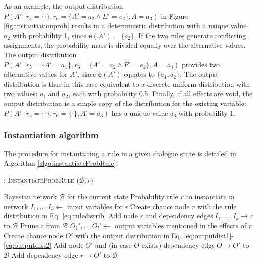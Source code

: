 As an example, the output distribution $P(A' \, | \, r_5\!=\!\{\cdot\},r_6\!=\!\{A'\!=\!a_2 \land E'\!=\!e_2\}, A\!=\!a_3)$ in Figure \ref{fig:instantiationprob} results in a deterministic distribution with a unique value $a_2$ with probability 1, since $\mathbf{e}(A') = \{a_2\}$. If the two rules generate conflicting assignments, the probability mass is divided equally over the alternative values.   The output distribution $P(A' \, | \, r_5\!=\!\{A'\!=\!a_1\},r_6\!=\!\{A'\!=\!a_2 \land E'\!=\!e_2\}, A\!=\!a_3)$ provides two alternative values for $A'$, since $\mathbf{e}(A')$ equates to $\{a_1,a_2\}$. The output distribution is thus in this case equivalent to a discrete uniform distribution with two values: $a_1$ and $a_2$, each with probability 0.5. Finally, if all effects are void, the output distribution is a simple copy of the distribution for the existing variable: $P(A' \, | \, r_5\!=\!\{\cdot\},r_6\!=\!\{\cdot\}, A'\!=\!a_3)$ has a unique value $a_3$ with probability 1. 



\subsubsection*{Instantiation algorithm} 
\label{sec:utilruleinstantiation}

The procedure for instantiating a rule in a given dialogue state is detailed in Algorithm \ref{algo:instantiateProbRule}. 

\begin{algorithm}[h!]
\caption{: \textsc{InstantiateProbRule} ($\mathcal{B}, \mathit{r}$)}
\begin{algorithmic}[1] \vspace{1mm}
\REQUIRE Bayesian network $\mathcal{B}$ for the current state
\REQUIRE Probability rule $\mathit{r}$ to instantiate in network  \vspace{1mm}
\STATE $I_1, \dots, I_k \leftarrow$ input variables for $\mathit{r}$
\STATE Create chance node $r$ with the rule distribution in Eq. \eqref{eq:ruledistrib}
\STATE Add node $r$ and dependency edges $I_1, \dots, I_k \rightarrow r$ to $\mathcal{B}$ 
\STATE Prune $r$ from $\mathcal{B}$
\ELSE
\STATE $O_1', \dots, O_l' \leftarrow$ output variables mentioned in the effects of $r$
\STATE Create chance node $O'$ with the output distribution in Eq. \eqref{eq:outputdist1}-\eqref{eq:outputdist2}
\STATE Add node $O'$ and (in case $O$ exists) dependency edge $O \rightarrow O'$ to $\mathcal{B}$
\ENDIF
\STATE Add dependency edge $r \rightarrow O'$ to $\mathcal{B}$ 
\ENDFOR
\ENDIF
\end{algorithmic}
\label{algo:instantiateProbRule}
\end{algorithm}

